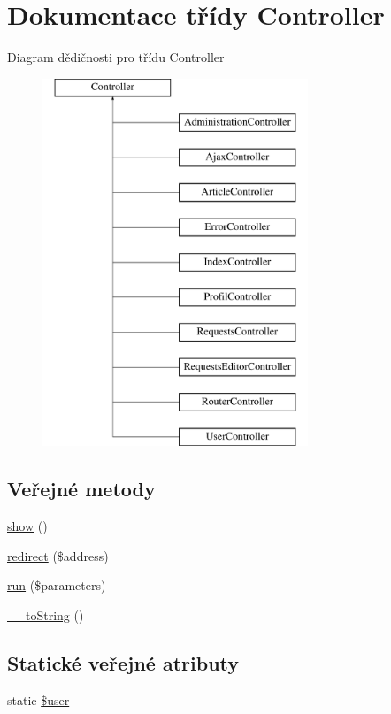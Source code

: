 \hypertarget{class_controller}{\section{Dokumentace třídy Controller}
\label{class_controller}
}
Diagram dědičnosti pro třídu Controller\begin{figure}[H]
\begin{center}
\leavevmode
\includegraphics[height=11.000000cm]{class_controller}
\end{center}
\end{figure}
\subsection*{Veřejné metody}
\begin{DoxyCompactItemize}
\item 
\hyperlink{class_controller_a9293a00d446117a5d1e3d081a62c2494}{show} ()
\item 
\hyperlink{class_controller_aa6adbd0431cdfb376a6e45bff607ee01}{redirect} (\$address)
\item 
\hyperlink{class_controller_aa244fd76011be76c98c0eb49069b41e3}{run} (\$parameters)
\item 
\hyperlink{class_controller_a505db1405269584edbd26f3e97d4ac80}{\-\_\-\-\_\-to\-String} ()
\end{DoxyCompactItemize}
\subsection*{Statické veřejné atributy}
\begin{DoxyCompactItemize}
\item 
static \hyperlink{class_controller_a27b4bba4d04b0ddc7a71e8e8e61a2a0c}{\$user}
\end{DoxyCompactItemize}
